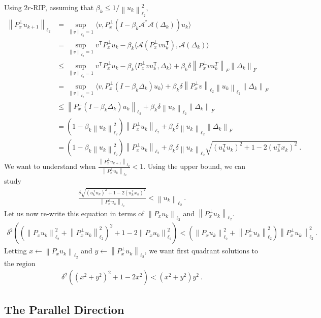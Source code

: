 \documentclass[10pt]{article}
\newcommand{\A}{\ensuremath{\mathcal{A}}}
\newcommand{\twonorm}[1]{\left\lVert #1 \right\rVert_{\ell_2}}
\newcommand{\fronorm}[1]{\left\lVert #1 \right\rVert_{F}}
\newcommand{\ip}[2]{\ensuremath{\langle #1, #2 \rangle}}
\newcommand{\T}{\mathsf{T}}
\begin{document}
Using $2r$-RIP,
assuming that $\beta_k \leq 1/\twonorm{u_k}^2$,
\begin{align*}
    \twonorm{P^\perp_x u_{k+1}} &= \sup_{\twonorm{v}=1} \ip{v}{P^\perp_x (I - \beta_k \A^*\A(\Delta_k)) u_k} \\
    &= \sup_{\twonorm{v}=1} v^\T P^\perp_x u_k - \beta_k\ip{\A(P^\perp_x v u_k^\T)}{\A(\Delta_k)} \\
    &\leq \sup_{\twonorm{v}=1} v^\T P^\perp_x u_k - \beta_k\ip{P^\perp_x vu_k^\T}{\Delta_k} + \beta_k \delta \fronorm{P^\perp_x vu_k^T}\fronorm{\Delta_k} \\
    &= \sup_{\twonorm{v}=1} \ip{v}{P^\perp_x (I - \beta_k \Delta_k) u_k} + \beta_k \delta \twonorm{P^\perp_x v} \twonorm{u_k}\fronorm{\Delta_k} \\
    &\leq \twonorm{P^\perp_x (I - \beta_k \Delta_k) u_k} + \beta_k \delta \twonorm{u_k}\fronorm{\Delta_k} \\
    &= (1 - \beta_k \twonorm{u_k}^2) \twonorm{P^\perp_x u_k} + \beta_k \delta \twonorm{u_k}\fronorm{\Delta_k} \\
    &= (1 - \beta_k \twonorm{u_k}^2) \twonorm{P^\perp_x u_k} + \beta_k \delta \twonorm{u_k}\sqrt{ (u_k^\T u_k)^2 + 1 - 2(u_k^\T x_k)^2 } \:.
\end{align*}
We want to understand
when $\frac{\twonorm{P^\perp_x u_{k+1}}}{\twonorm{P^\perp_x u_k}} < 1$.
Using the upper bound, we can study
\begin{align*}
  \frac{\delta \sqrt{ (u_k^\T u_k)^2 + 1 - 2(u_k^\T x_k)^2 } }{\twonorm{P^\perp_x u_k}} < \twonorm{u_k} \:.
\end{align*}
Let us now re-write this equation in terms of
$\twonorm{P_x u_k}$ and $\twonorm{P^\perp_x u_k}$.
\begin{align*}
  \delta^2 \left( (\twonorm{P_x u_k}^2 + \twonorm{P^\perp_x u_k}^2)^2 + 1 - 2\twonorm{P_x u_k}^2 \right) < (\twonorm{P_x u_k}^2 + \twonorm{P^\perp_x u_k}^2)\twonorm{P^\perp_x u_k}^2 \:.
\end{align*}
Letting $x \gets \twonorm{P_x u_k}$ and
$y \gets \twonorm{P^\perp_x u_k}$, we want first quadrant solutions to the region
\begin{align*}
  \delta^2( (x^2+y^2)^2 + 1 - 2x^2) < (x^2 + y^2)y^2 \:.
\end{align*}

\subsection{The Parallel Direction}
\end{document}
